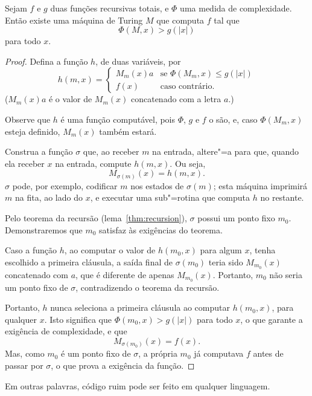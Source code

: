 \begin{proposition}
    Sejam $f$ e $g$ duas funções recursivas totais,
    e $\Phi$ uma medida de complexidade.
    Então existe uma máquina de Turing $M$ que computa $f$
    tal que
    \begin{equation*}
        \Phi(M, x) > g(|x|)
    \end{equation*}
    para todo $x$.
    \label{thm:resource_waste}
\end{proposition}

\begin{proof}
    Defina a função $h$, de duas variáveis, por
    \begin{equation*}
        h(m, x) = \begin{cases}
            M_m(x) a & \text{se $\Phi(M_m, x) \leq g(|x|)$} \\
            f(x) & \text{caso contrário.}
        \end{cases}
    \end{equation*}
    ($M_m(x)a$ é o valor de $M_m(x)$ concatenado com a letra $a$.)

    Observe que $h$ é uma função computável,
    pois $\Phi$, $g$ e $f$ o são,
    e, caso $\Phi(M_m, x)$ esteja definido,
    $M_m(x)$ também estará.

    Construa a função $\sigma$ que,
    ao receber $m$ na entrada,
    altere"=a para que,
    quando ela receber $x$ na entrada,
    compute $h(m, x)$.
    Ou seja,
    \begin{equation*}
        M_{\sigma(m)}(x) = h(m, x).
    \end{equation*}
    $\sigma$ pode, por exemplo,
    codificar $m$ nos estados de $\sigma(m)$;
    esta máquina imprimirá $m$ na fita,
    ao lado do $x$,
    e executar uma sub"=rotina que computa $h$ no restante.

    Pelo teorema da recursão (lema~\ref{thm:recursion}),
    $\sigma$ possui um ponto fixo $m_0$.
    Demonstraremos que $m_0$ satisfaz às exigências do teorema.

    Caso a função $h$, ao computar o valor de $h(m_0, x)$
    para algum $x$,
    tenha escolhido a primeira cláusula,
    a saída final de $\sigma(m_0)$ teria sido
    $M_{m_0} (x)$ concatenado com $a$,
    que é diferente de apenas $M_{m_0}(x)$.
    Portanto, $m_0$ não seria um ponto fixo de $\sigma$,
    contradizendo o teorema da recursão.

    Portanto, $h$ nunca seleciona a primeira cláusula
    ao computar $h(m_0, x)$, para qualquer $x$.
    Isto significa que $\Phi(m_0, x) > g(|x|)$ para todo $x$,
    o que garante a exigência de complexidade,
    e que
    \begin{equation*}
        M_{\sigma(m_0)}(x) = f(x).
    \end{equation*}
    Mas, como $m_0$ é um ponto fixo de $\sigma$,
    a própria $m_0$ já computava $f$ antes de passar por $\sigma$,
    o que prova a exigência da função.
\end{proof}

Em outras palavras,
código ruim pode ser feito em qualquer linguagem.
